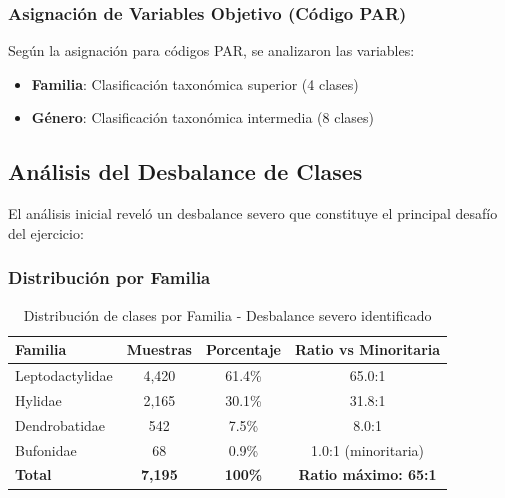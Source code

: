 \documentclass[12pt,a4paper]{article}
\begin{document}
\subsubsection{Asignación de Variables Objetivo (Código PAR)}
Según la asignación para códigos PAR, se analizaron las variables:
\begin{itemize}
    \item \textbf{Familia}: Clasificación taxonómica superior (4 clases)
    \item \textbf{Género}: Clasificación taxonómica intermedia (8 clases)
\end{itemize}

\subsection{Análisis del Desbalance de Clases}
El análisis inicial reveló un desbalance severo que constituye el principal desafío del ejercicio:

\subsubsection{Distribución por Familia}
\begin{table}[H]
\centering
\begin{tabular}{|l|c|c|c|}
\hline
\textbf{Familia} & \textbf{Muestras} & \textbf{Porcentaje} & \textbf{Ratio vs Minoritaria} \\
\hline
Leptodactylidae & 4,420 & 61.4\% & 65.0:1 \\
Hylidae & 2,165 & 30.1\% & 31.8:1 \\
Dendrobatidae & 542 & 7.5\% & 8.0:1 \\
Bufonidae & 68 & 0.9\% & 1.0:1 (minoritaria) \\
\hline
\textbf{Total} & \textbf{7,195} & \textbf{100\%} & \textbf{Ratio máximo: 65:1} \\
\hline
\end{tabular}
\caption{Distribución de clases por Familia - Desbalance severo identificado}
\end{table}
\end{document}
